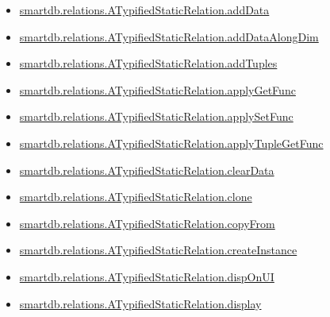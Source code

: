\documentclass[letterpaper,10pt,english]{sphinxmanual}
\begin{document}
\begin{itemize}
\item {} 
{\hyperref[chap_functions:smartdb-relations-atypifiedstaticrelation-adddata]{smartdb.relations.ATypifiedStaticRelation.addData}}

\item {} 
{\hyperref[chap_functions:smartdb-relations-atypifiedstaticrelation-adddataalongdim]{smartdb.relations.ATypifiedStaticRelation.addDataAlongDim}}

\item {} 
{\hyperref[chap_functions:smartdb-relations-atypifiedstaticrelation-addtuples]{smartdb.relations.ATypifiedStaticRelation.addTuples}}

\item {} 
{\hyperref[chap_functions:smartdb-relations-atypifiedstaticrelation-applygetfunc]{smartdb.relations.ATypifiedStaticRelation.applyGetFunc}}

\item {} 
{\hyperref[chap_functions:smartdb-relations-atypifiedstaticrelation-applysetfunc]{smartdb.relations.ATypifiedStaticRelation.applySetFunc}}

\item {} 
{\hyperref[chap_functions:smartdb-relations-atypifiedstaticrelation-applytuplegetfunc]{smartdb.relations.ATypifiedStaticRelation.applyTupleGetFunc}}

\item {} 
{\hyperref[chap_functions:smartdb-relations-atypifiedstaticrelation-cleardata]{smartdb.relations.ATypifiedStaticRelation.clearData}}

\item {} 
{\hyperref[chap_functions:smartdb-relations-atypifiedstaticrelation-clone]{smartdb.relations.ATypifiedStaticRelation.clone}}

\item {} 
{\hyperref[chap_functions:smartdb-relations-atypifiedstaticrelation-copyfrom]{smartdb.relations.ATypifiedStaticRelation.copyFrom}}

\item {} 
{\hyperref[chap_functions:smartdb-relations-atypifiedstaticrelation-createinstance]{smartdb.relations.ATypifiedStaticRelation.createInstance}}

\item {} 
{\hyperref[chap_functions:smartdb-relations-atypifiedstaticrelation-disponui]{smartdb.relations.ATypifiedStaticRelation.dispOnUI}}

\item {} 
{\hyperref[chap_functions:smartdb-relations-atypifiedstaticrelation-display]{smartdb.relations.ATypifiedStaticRelation.display}}


\end{itemize}
\end{document}
